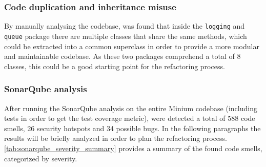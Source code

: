 \subsubsection{Code duplication and inheritance misuse}

By manually analysing the codebase, was found that inside the \texttt{logging} and \texttt{queue} package  there are multiple classes that share the same methods, which could be extracted into a common superclass in order to provide a more modular and maintainable codebase. As these two packages comprehend a total of 8 classes, this could be a good starting point for the refactoring process.

\subsubsection{SonarQube analysis}

After running the SonarQube analysis on the entire Minium codebase (including tests in order to get the test coverage metric), were detected a total of 588 code smells, 26 security hotspots and 34 possible bugs. In the following paragraphs the results will be briefly analyzed in order to plan the refactoring process. \autoref{tab:sonarqube_severity_summary} provides a summary of the found code smells, categorized by severity.

